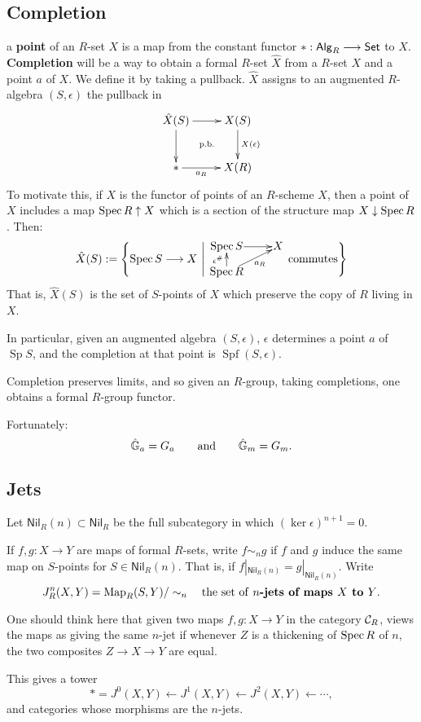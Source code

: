 \documentclass[11pt]{article}
\newcommand{\RAlg}{\mathsf{Alg}_R}
\newcommand{\RNil}{\mathsf{Nil}_R}
\DeclareMathOperator{\SPec}{Sp}
\DeclareMathOperator{\SPf}{Spf}
\begin{document}
\subsection{Completion}
\begin{itemise}
\setlength{\parindent}{.25in}
\item {} a \textbf{point} of an $R$-set $X$ is a map from the constant functor $\ast:\RAlg\to\Set$ to $X$. \textbf{Completion} will be a way to obtain a formal $R$-set $\hat{X}$ from a $R$-set $X$ and a point $a$ of $X$. We define it by taking a pullback. $\hat X$ assigns to an augmented $R$-algebra $(S,\epsilon)$ the pullback in
\[\xymatrix{
\hat X(S) %
\ar[r]   %
\ar[d]   %
\ar@{}[rd]|{\textup{p.b.}}&
X(S) %
\ar[d]^-{X(\epsilon)}\\ %
\ast %
\ar[r]_-{a_R}&  %
X(R)  %
}\]
To motivate this, if $X$ is the functor of points of an $R$-scheme $X$, then a point of $X$ includes a map $\operatorname{Spec} R\uparrow X$ which is a section of the structure map $X\downarrow\operatorname{Spec} R$. Then:%
\[\hat X(S):=\left\{\spec S\to X\ \middle|\ 
\vcenter{\xymatrix@R=4mm@1{
\spec S
\ar[r]
&%
X\\%
\spec R
\ar[u]^-{\epsilon^\#}
\ar[ur]_-{a_R}
&%
}}\textup{\ commutes}\right\}\]
That is, $\hat X(S)$ is the set of $S$-points of $X$ which preserve the copy of $R$ living in $X$.
\item In particular, given an augmented algebra $(S,\epsilon)$, $\epsilon$ determines a point $a$ of $\SPec S$, and the completion at that point is $\SPf(S,\epsilon)$.
\item Completion preserves limits, and so given an $R$-group, taking completions, one obtains a formal $R$-group functor.
\item Fortunately:
\[\hat{\mathbb{G}}_a=G_a\qquad \textup{and}\qquad \hat{\mathbb{G}}_m=G_m.\]
\end{itemise}
\subsection{Jets}
\begin{itemise}
\setlength{\parindent}{.25in}
\item Let $\RNil(n)\subset \RNil$ be the full subcategory in which $(\ker\epsilon)^{n+1}=0$.
\item If $f,g:X\to Y$ are maps of formal $R$-sets, write $f\sim_n g$ if $f$ and $g$ induce the same map on $S$-points for $S\in\RNil(n)$. That is, if $f|_{\RNil(n)}=g|_{\RNil(n)}$. Write
\[J^n_R(X,Y)=\operatorname{Map}_R(S,Y)/\sim_n\textup{\quad the set of \textbf{$n$-jets of maps $X$ to $Y$}.}\]
\begin{shaded}
One should think here that given two maps $f,g:X\to Y$ in the category $\mathcal{C}_R$, views the maps as giving the same $n$-jet if whenever $Z$ is a thickening of $\operatorname{Spec} R$ of  $n$, the two composites $Z\to X\to Y$ are equal.
\end{shaded}
This gives a tower
\[\ast=J^0(X,Y)\leftarrow J^1(X,Y)\leftarrow J^2(X,Y)\leftarrow\cdots, \]
and categories whose morphisms are the $n$-jets.
\end{itemise}
\end{document}

